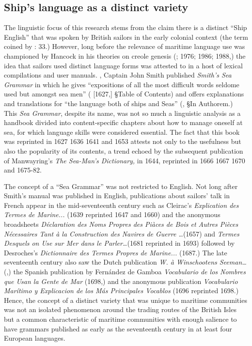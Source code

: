 \subsection{{Ship’s} {language} {as} {a} {distinct} {variety}}%



The linguistic focus of this research stems from the claim there is a distinct “Ship English” that was spoken by British sailors in the early colonial context (the term coined by \citealt{Hancock1976}: 33.) However, long before the relevance of maritime language use was championed by Hancock in his theories on creole genesis (\citealt{Hancock1972}; 1976; 1986; 1988,) the idea that sailors used distinct language forms was attested to in a host of lexical compilations and user manuals. \citealt{In1627}, Captain John Smith published \textit{Smith’s Sea Grammar} in which he gives “expositions of all the most difficult words seldome used but amongst sea men” (\citealt{Smith1968} [1627,] §Table of Contents) and offers explanations and translations for “the language both of ships and Seas” (\citealt{Smith1968}, §In Authorem.) This \textit{Sea Grammar}, despite its name, was not so much a linguistic analysis as a handbook divided into content-specific chapters about how to manage oneself at sea, for which language skills were considered essential. The fact that this book was reprinted in 1627 1636 1641 and 1653 attests not only to the usefulness but also the popularity of its contents, a trend echoed by the subsequent publication of Manwayring’s \textit{The Sea-Man’s Dictionary,} in 1644, reprinted in 1666 1667 1670 and 1675-82. 



The concept of a “Sea Grammar” was not restricted to English. Not long after Smith’s manual was published in English, publications about sailors’ talk in French appear in the mid-seventeenth century such as Cleirac’s \textit{Explication des Termes de Marine...} (1639 reprinted 1647 and 1660) and the anonymous broadsheets \textit{Déclaration des Noms Propres des Piàces de Bois et Autres Pièces Nécessaires Tant à la Construction des Navires de Guerre …}(1657) and \textit{Termes Desquels on Use sur Mer dans le Parler…}(1681 reprinted in 1693) followed by Desroches’s \textit{Dictionnaire des Termes Propres de Marine...} (1687.) The late seventeenth century also saw the Dutch publication \textit{W. à Winschootens Seeman…} (\citealt{Winschooten1681},) the Spanish publication by Fernández de Gamboa \textit{Vocabulario de los Nombres que Usan la Gente de Mar} (1698,) and the anonymous publication \textit{Vocabulario Marítimo y Explicacion de los Más Principales Vocablos} (1696 reprinted 1698.) Hence, the concept of a distinct variety that was unique to maritime communities was not an isolated phenomenon around the trading routes of the British Isles but a common characteristic of maritime communities with enough salience to have grammars published as early as the seventeenth century in at least four European languages. 



